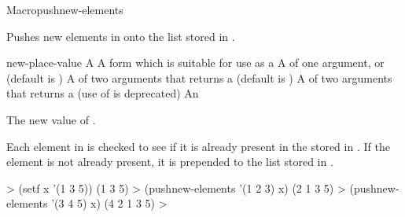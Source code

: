 \documentclass[10pt,twoside,english,pdftex]{article}
\begin{document}
\begin{functiondoc}{Macro}{pushnew-elements}{
      
    \returns{} } 
%
%
  
\fnsyntax

\fnpurpose Pushes new elements in  onto the list stored in
. 

\fnpackage {}

\fnmodule {}

\fnargs
\begin{args}{new-place-value}
\arg[list] A 
\arg[place] A form which is suitable for use as a
\arg[key] A  of one argument, or \nil{} (default is \nil)
\arg[test] A  of two arguments that returns a
 (default is ) 
 A  of two arguments that returns a
 (use of  is deprecated)
 An 
\end{args}

\fnreturns The new value of . 

\fndescription Each element in  is checked to see if it is
already present in the  stored in . If
the element is not already present, it is prepended to the list stored
in .

\fnexamples
%
\W\supp
\begin{example}
  > (setf x '(1 3 5))
  (1 3 5)
  > (pushnew-elements '(1 2 3) x)
  (2 1 3 5)
  > (pushnew-elements '(3 4 5) x)
  (4 2 1 3 5)
  >
\end{example}

\end{functiondoc}

\end{document}
